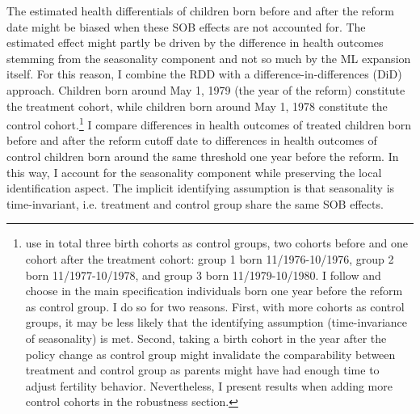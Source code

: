 \documentclass[11pt, a4paper, draft]{article} %
\begin{document}
The estimated health differentials of children born before and after the reform date might be biased when these SOB effects are not accounted for. The estimated effect might partly be driven by the difference in health outcomes stemming from the seasonality component and not so much by the ML expansion itself. For this reason, I combine the RDD with a difference-in-differences (DiD) approach. Children born around May 1, 1979 (the year of the reform) constitute the treatment cohort, while children born around May 1, 1978 constitute the control cohort.\footnote{\cite{Dustmann2012} use in total three birth cohorts as control groups, two cohorts before and one cohort after the treatment cohort: group 1 born 11/1976-10/1976, group 2 born 11/1977-10/1978, and group 3 born 11/1979-10/1980. I follow \cite{guertzgen2018} and choose in the main specification individuals born one year before the reform as control group. I do so for two reasons. First, with more cohorts as control groups, it may be less likely that the identifying assumption (time-invariance of seasonality) is met. Second, taking a birth cohort in the year after the policy change as control group might invalidate the comparability between treatment and control group as parents might have had enough time to adjust fertility behavior. Nevertheless, I present results when adding more control cohorts in the robustness section.} I compare differences in health outcomes of treated children born before and after the reform cutoff date to differences in health outcomes of control children born around the same threshold one year before the reform. In this way, I account for the seasonality component while preserving the local identification aspect. The implicit identifying assumption is that seasonality is time-invariant, i.e. treatment and control group share the same SOB effects.
\end{document}
